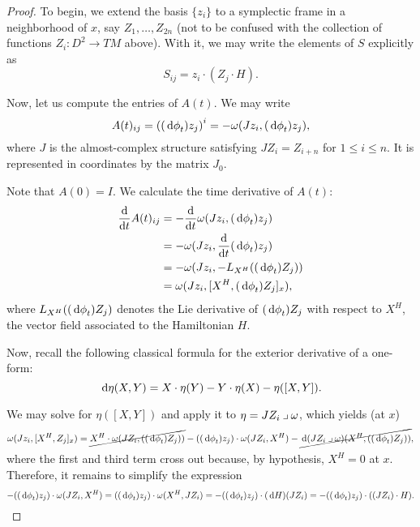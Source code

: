 \begin{proof}
To begin, we extend the basis $\{z_i\}$ to a symplectic frame in a neighborhood of $x$, say $Z_1, \dots, Z_{2n}$ (not to be confused with the collection of functions $Z_i \colon D^2 \to TM$ above). With it, we may write the elements of $S$ explicitly as
\begin{equation}
S_{ij} = z_i \cdot (Z_j \cdot H).
\end{equation}

Now, let us compute the entries of $A(t)$. We may write
\begin{equation}
A(t)_{ij} = \left((\dl \phi_t) z_j \right)^i = -\omega(J z_i, (\dl \phi_t) z_j),
\end{equation}
where $J$ is the almost-complex structure satisfying $J Z_i = Z_{i+n}$ for $1 \leq i \leq n$. It is represented in coordinates by the matrix $J_0$.

Note that $A(0) = I$. We calculate the time derivative of $A(t)$:
\begin{equation}
\begin{aligned}
\diff*{A(t)_{ij}}t &= - \diff*{\omega(J z_i, (\dl \phi_t) z_j)}t\\
&= - \omega(J z_i, \diff*{(\dl \phi_t) z_j}t)\\
&= - \omega(J z_i, - \Lie_{X^H} ((\dl \phi_t) Z_j))\\
&= \omega(J z_i, [X^H,(\dl \phi_t) Z_j]_x),
\end{aligned}
\end{equation}
where $\Lie_{X^H} ((\dl \phi_t)Z_j)$ denotes the Lie derivative of $(\dl \phi_t)Z_j$ with respect to $X^H$, the vector field associated to the Hamiltonian $H$.

Now, recall the following classical formula for the exterior derivative of a one-form:
\begin{equation}
\dl \eta(X,Y) = X \cdot \eta(Y) - Y \cdot \eta(X) - \eta([X,Y]).
\end{equation}

We may solve for $\eta([X,Y])$ and apply it to $\eta = J Z_i \mathbin{\lrcorner} \omega$, which yields (at $x$)
\begin{equation}
\omega(J z_i, [X^H, Z_j]_x) = \cancel{X^H \cdot \omega(J Z_i, ((\dl \phi_t)Z_j))} - ((\dl \phi_t) z_j) \cdot \omega(J Z_i, X^H) - \cancel{\dl(J Z_i \into \omega)(X^H, ((\dl \phi_t)Z_j))},
\end{equation}
where the first and third term cross out because, by hypothesis, $X^H = 0$ at $x$. Therefore, it remains to simplify the expression
\begin{equation}
- ((\dl \phi_t) z_j) \cdot \omega(J Z_i, X^H) = ((\dl \phi_t) z_j) \cdot \omega(X^H, J Z_i) = - ((\dl \phi_t) z_j) \cdot (\dl H)(J Z_i) = - ((\dl \phi_t) z_j) \cdot ((J Z_i) \cdot H).
\end{equation}


\end{proof}
